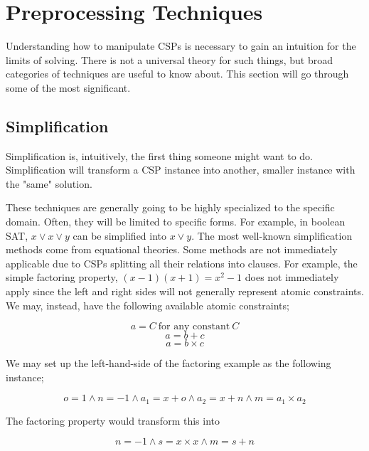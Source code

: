 \section{Preprocessing Techniques}\label{sec:preprocessing}
Understanding how to manipulate CSPs is necessary to gain an intuition for the limits of solving. There is not a universal theory for such things, but broad categories of techniques are useful to know about. This section will go through some of the most significant.

\subsection{Simplification}\label{sec:simplification}
Simplification is, intuitively, the first thing someone might want to do. Simplification will transform a CSP instance into another, smaller instance with the "same" solution.

These techniques are generally going to be highly specialized to the specific domain. Often, they will be limited to specific forms. For example, in boolean SAT, $x \vee x \vee y$ can be simplified into $x \vee y$. The most well-known simplification methods come from equational theories. Some methods are not immediately applicable due to CSPs splitting all their relations into clauses. For example, the simple factoring property, $(x-1) (x+1) = x^2 - 1$ does not immediately apply since the left and right sides will not generally represent atomic constraints. We may, instead, have the following available atomic constraints;

\begin{equation}
    a = C\ \text{for any constant}\ C
\end{equation}
\begin{equation}
    a = b + c
\end{equation}
\begin{equation}
    a = b \times c
\end{equation}

We may set up the left-hand-side of the factoring example as the following instance;

\begin{equation}
    o = 1 \wedge n = -1 \wedge a_1 = x + o \wedge a_2 = x + n \wedge m = a_1 \times a_2
\end{equation}

The factoring property would transform this into

\begin{equation}
    n = -1 \wedge s = x \times x \wedge m = s + n
\end{equation}

